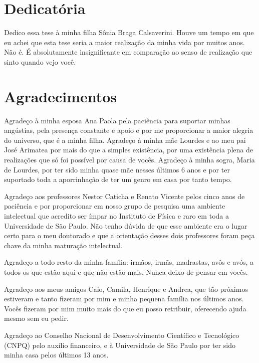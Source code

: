 \begin{titlepage}

\chapter*{Dedicatória}

Dedico essa tese à minha filha Sônia Braga Calsaverini. Houve um tempo em que eu achei que esta tese seria a maior realização da minha vida por muitos anos. Não é. É absolutamente insignificante em comparação ao senso de realização que sinto quando vejo você.

\chapter*{Agradecimentos}

Agradeço à minha esposa Ana Paola pela paciência para suportar minhas angústias, pela presença constante e apoio e por me proporcionar a maior alegria do universo, que é a minha filha. Agradeço à minha mãe Lourdes e ao meu pai José Arimatea por mais do que a simples existência, por uma existência plena de realizações que só foi possível por causa de vocês. Agradeço à minha sogra, Maria de Lourdes, por ter sido minha quase mãe nesses últimos 6 anos e por ter suportado toda a aporrinhação de ter um genro em casa por tanto tempo.

Agradeço aos professores Nestor Caticha e Renato Vicente pelos cinco anos de paciência e por proporcionar em nosso grupo de pesquisa uma ambiente intelectual que acredito ser ímpar no Instituto de Física e raro em toda a Universidade de São Paulo. Não tenho dúvida de que esse ambiente era o lugar certo para o meu doutorado e que a orientação desses dois professores foram peça chave da minha maturação intelectual. 

Agradeço a todo resto da minha família: irmãos, irmãs, madrastas, avôs e avós, a todos os que estão aqui e que não estão mais. Nunca deixo de pensar em vocês. 

Agradeço aos meus amigos Caio, Camila, Henrique e Andrea, que tão próximos estiveram e tanto fizeram por mim e minha pequena família nos últimos anos. Vocês fizeram por mim muito mais do que eu posso retribuir, oferecendo ajuda mesmo sem eu pedir.

Agradeço ao Conselho Nacional de Desenvolvimento Científico e Tecnológico (CNPQ) pelo auxílio financeiro, e à Universidade de São Paulo por ter sido minha casa pelos últimos 13 anos. 

    \end{titlepage}
